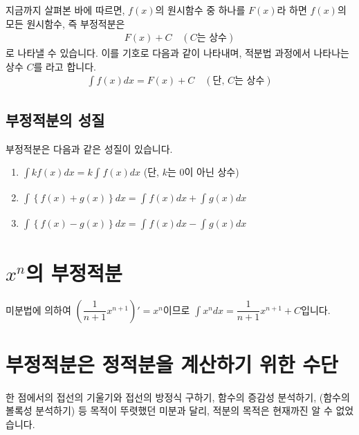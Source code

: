 지금까지 살펴본 바에 따르면, $f(x)$의 원시함수 중 하나를 $F(x)$라 하면 $f(x)$의 모든 원시함수, 즉 부정적분은
\begin{align*} F(x)+C \quad(\text{$C$는 상수})\end{align*}
로 나타낼 수 있습니다. 이를 기호로 다음과 같이 나타내며, 적분법 과정에서 나타나는 상수 $C$를 라고 합니다.
\begin{align*} \int f\left( x \right)dx = F(x) + C \quad(\text{단, $C$는 상수}) \end{align*}
\clearpage
\subsection{부정적분의 성질}
부정적분은 다음과 같은 성질이 있습니다.
\begin{enumerate}[label={\onum*}]
    \item $\int k f\left( x \right) dx = k\int_{}^{}f\left( x \right) dx$ (단, $k$는 $0$이 아닌 상수)
    \item $\int \left\{ f\left( x \right) + g\left( x \right) \right\}   dx = \int_{}^{}f\left( x \right) dx + \int_{}^{}g\left( x \right) dx$
    \item $\int \left\{ f\left( x \right) - g\left( x \right) \right\}   dx = \int_{}^{}f\left( x \right) dx - \int_{}^{}g\left( x \right) dx$
\end{enumerate}

\section{$x^n$의 부정적분}
미분법에 의하여 $\left( \dfrac{1}{n+1}x^{n+1} \right)' =  x^{n}$이므로 $\int x^n dx = \dfrac{1}{n+1}x^{n+1}+C$입니다.

\section{부정적분은 정적분을 계산하기 위한 수단}
한 점에서의 접선의 기울기와 접선의 방정식 구하기, 함수의 증감성 분석하기, (함수의 볼록성 분석하기) 등 목적이 뚜렷했던 미분과 달리, 적분의 목적은 현재까진 알 수 없었습니다.

